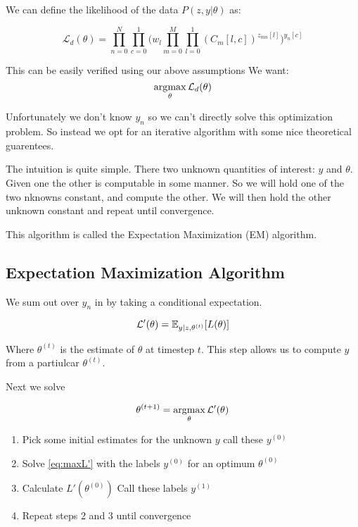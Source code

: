 We can define the likelihood of the data $P(z,y| \theta)$ as:

\begin{equation}  \label{eq:L}
\mathcal{L}_{d}(\theta) =
\displaystyle\prod\limits_{n=0}^{N} \displaystyle\prod\limits_{c=0}^{1}
\Big (w_{l} \displaystyle\prod\limits_{m=0}^{M} \displaystyle\prod\limits_{l=0}^{1} (C_{m}[l,c])^{z_{mn}[l]} \Big )^{y_{n}[c]}
\end{equation}

This can be easily verified using our above assumptions
We want: \\

\begin{equation} \label{eq:maxL}
\operatorname*{arg\!\max}_{\theta} \mathcal{L}_{d}(\theta)
\end{equation}

Unfortunately we don't know $y_{n}$ so we can't directly solve this optimization problem.
So instead we opt for an iterative algorithm with some nice theoretical guarentees. 


The intuition is quite simple. There two unknown quantities of interest: $y$ and $\theta$.
Given one the other is computable in some manner. So we will hold one of the two nknowns constant,
and compute the other. We will then hold the other unknown constant and repeat until convergence.

This algorithm is called the Expectation Maximization (EM) algorithm.

\subsection{Expectation Maximization Algorithm}

We sum out over $y_{n}$ in \label{eq:L} by taking a
conditional expectation.

\begin{equation} \label{eq:L'}
    \mathcal{L'}(\theta) = \mathbb{E}_{y | z, \theta^{(t)}}[L(\theta)]
\end{equation}

Where $\theta^{(t)}$ is the estimate of $\theta$ at timestep $t$. This step allows us to compute $y$ from a partiulcar 
$\theta^{(t)}$.

Next we solve

\begin{equation} \label{eq:maxL'}
    \theta^{(t+1)} = \operatorname*{arg\!\max}_{\theta} \mathcal{L'}(\theta)
\end{equation}


\begin{enumerate}
    \item Pick some initial estimates for the unknown $y$ call these $y^{(0)}$
    \item Solve \eqref{eq:maxL'} with the labels $y^{(0)}$ for an optimum $\theta^{(0)}$
    \item Calculate $L'(\theta^{(0)})$ Call these labels $y^{(1)}$
    \item Repeat steps 2 and 3 until convergence
\end{enumerate}

